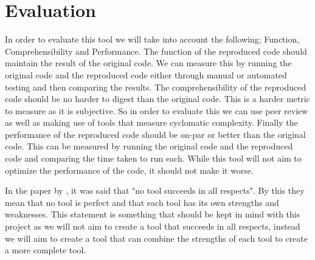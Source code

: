 \documentclass{article} %
\begin{document}
\section{Evaluation}

In order to evaluate this tool we will take into account the following; Function, Comprehensibility and Performance.
The function of the reproduced code should maintain the result of the original code. We can measure this by running the original code and the reproduced code either through manual or automated testing and then comparing the results.
The comprehensibility of the reproduced code should be no harder to digest than the original code. This is a harder metric to measure as it is subjective. So in order to evaluate this we can use peer review as well as making use of tools that measure cyclomatic complexity.
Finally the performance of the reproduced code should be on-par or better than the original code. This can be measured by running the original code and the reproduced code and comparing the time taken to run each. While this tool will not aim to optimize the performance of the code, it should not make it worse.

In the paper by \cite{8681007}, it was said that "no tool succeeds in all respects". By this they mean that no tool is perfect and that each tool has its own strengths and weaknesses. This statement is something that should be kept in mind with this project as we will not aim to create a tool that succeeds in all respects, instead we will aim to create a tool that can combine the strengths of each tool to create a more complete tool.


\end{document}
